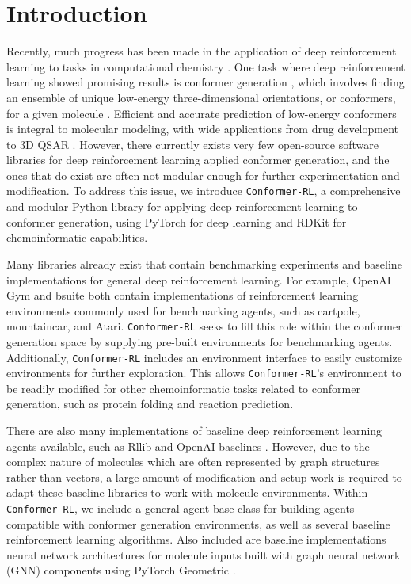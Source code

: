 \documentclass[twoside,11pt]{article}
\newcommand{\code}[1]{\texttt{#1}}
\newcommand{\titleofpaper}{Conformer-RL}
\begin{document}
\section{Introduction}
Recently, much progress has been made in the application of deep reinforcement learning to tasks in computational chemistry \citep{li2018foldingzero,zhou2017reactions,simm2020moldesign}. One task where deep reinforcement learning showed promising results is conformer generation \citep{gogineni2020torsionnet}, which involves finding an ensemble of unique low-energy three-dimensional orientations, or conformers, for a given molecule \citep{ebejer2020confgen}. Efficient and accurate prediction of low-energy conformers is integral to molecular modeling, with wide applications from drug development to 3D QSAR \citep{cole2018confgen}. However, there currently exists very few open-source software libraries for deep reinforcement learning applied conformer generation, and the ones that do exist are often not modular enough for further experimentation and modification. To address this issue, we introduce \code{\titleofpaper}, a comprehensive and modular Python library for applying deep reinforcement learning to conformer generation, using PyTorch \citep{torch} for deep learning and RDKit for chemoinformatic capabilities.

Many libraries already exist that contain benchmarking experiments and baseline implementations for general deep reinforcement learning. For example, OpenAI Gym \citep{brockman2016gym} and bsuite \citep{osband2020bsuite} both contain implementations of reinforcement learning environments commonly used for benchmarking agents, such as cartpole, mountaincar, and Atari. \code{\titleofpaper} seeks to fill this role within the conformer generation space by supplying pre-built environments for benchmarking agents. Additionally, \code{\titleofpaper} includes an environment interface to easily customize environments for further exploration. This allows \code{\titleofpaper}'s environment to be readily modified for other chemoinformatic tasks related to conformer generation, such as protein folding and reaction prediction.

There are also many implementations of baseline deep reinforcement learning agents available, such as Rllib \citep{liang2018rllib} and OpenAI baselines \citep{dhariwal2018baselines}. However, due to the complex nature of molecules which are often represented by graph structures rather than vectors, a large amount of modification and setup work is required to adapt these baseline libraries to work with molecule environments. Within \code{\titleofpaper}, we include a general agent base class for building agents compatible with conformer generation environments, as well as several baseline reinforcement learning algorithms. Also included are baseline implementations neural network architectures for molecule inputs built with graph neural network (GNN) components using PyTorch Geometric \citep{fey2019geometric}.
\end{document}
